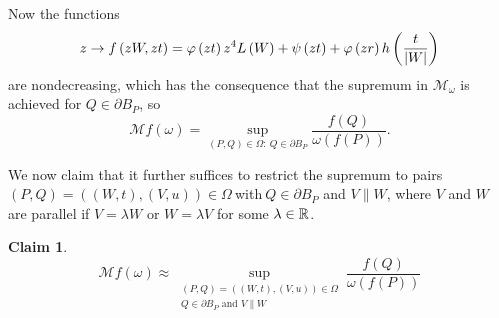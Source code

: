 \documentclass{amsart}
\theoremstyle{plain}
\newtheorem{claim}{Claim}
\numberwithin{equation}{section}
\begin{document}
Now the functions%
\begin{equation*}
z\rightarrow f\left( zW,zt\right) =\varphi \left( zt\right) z^{4}L\left(
W\right) +\psi \left( zt\right) +\varphi \left( zr\right) h\left( \frac{t}{%
\left\vert W\right\vert }\right)
\end{equation*}%
are nondecreasing, which has the consequence that the supremum in $\mathcal{M%
}_{\omega }$ is achieved for $Q\in \partial B_{P}$, so%
\begin{equation*}
\mathcal{M}f\left( \omega \right) =\sup_{\left( P,Q\right) \in \Omega :\
Q\in \partial B_{P}}\frac{f\left( Q\right) }{\omega \left( f\left( P\right)
\right) }.
\end{equation*}

We now claim that it further suffices to restrict the supremum to pairs $%
\left( P,Q\right) =\left( \left( W,t\right) ,\left( V,u\right) \right) \in
\Omega \ $with$\ Q\in \partial B_{P}$ and $V\parallel W$, where $V$ and $W$
are parallel if $V=\lambda W$ or $W=\lambda V$ for some $\lambda \in \mathbb{%
R}$.

\begin{claim}
\begin{equation}
\mathcal{M}f\left( \omega \right) \approx \sup_{\substack{ \left( P,Q\right)
=\left( \left( W,t\right) ,\left( V,u\right) \right) \in \Omega  \\ Q\in
\partial B_{P}\text{ and }V\parallel W}}\frac{f\left( Q\right) }{\omega
\left( f\left( P\right) \right) }  \label{main sup}
\end{equation}
\end{claim}
\end{document}
